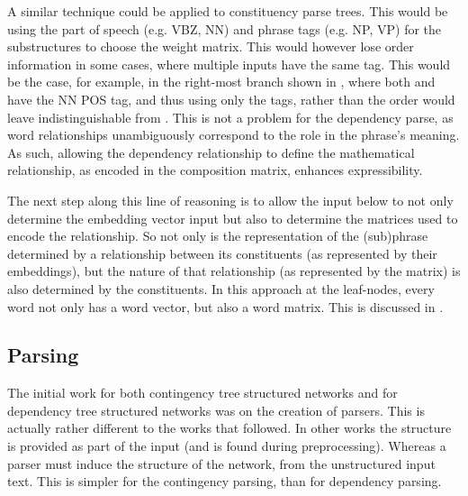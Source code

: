 \documentclass[12pt,parskip]{komatufte}
\begin{document}
A similar technique could be applied to constituency parse trees.
This would be using the part of speech (e.g. VBZ, NN) and phrase tags (e.g. NP, VP) for the substructures to choose the weight matrix.
This would however lose order information in some cases, where multiple inputs have the same tag.
This would be the case, for example, in the right-most branch shown in , where both  and  have the NN POS tag, and thus using only the tags, rather than the order would leave  indistinguishable from .
This is not a problem for the dependency parse, as word relationships unambiguously correspond to the role in the phrase's meaning.
As such, allowing the dependency relationship to define the mathematical relationship, as encoded in the composition matrix, enhances expressibility.



The next step along this line of reasoning is to allow the input below to not only determine the embedding vector input but also to determine the matrices used to encode the relationship.
So not only is the representation of the (sub)phrase determined by a relationship between  its constituents (as represented by their embeddings),
but the nature of that relationship (as represented by the matrix) is also determined by the constituents.
In this approach at the leaf-nodes, every word not only has a word vector, but also a word matrix.
This is discussed in .



\subsection{Parsing} \label{sec:parsing}

The initial work for both contingency tree structured networks  \parencite{socher2010PhraseEmbedding} and for dependency tree structured networks  was on the creation of parsers.
This is actually rather different to the works that followed.
In other works the structure is provided as part of the input (and is found during preprocessing).
Whereas a parser must induce the structure of the network,
from the unstructured input text.
This is simpler for the contingency parsing, than for dependency parsing.

\end{document}
